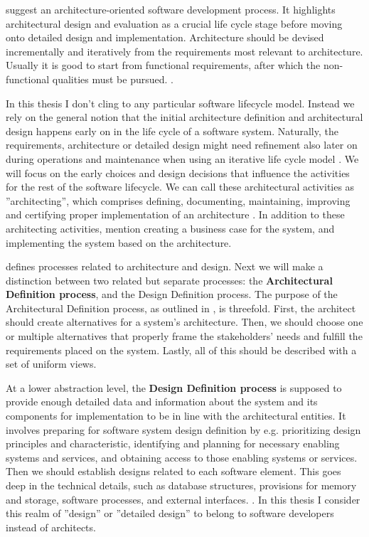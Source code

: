 \documentclass[utf8,english]{gradu3}
\begin{document}
\textcite{Koskimies2005} suggest an architecture-oriented software
development process. It highlights architectural design and evaluation as a
crucial life cycle stage before moving onto detailed design and implementation.
Architecture should be devised incrementally and iteratively from the
requirements most relevant to architecture. Usually it is good to start from
functional requirements, after which the non-functional qualities must be
pursued. \parencite{Koskimies2005}.

In this thesis I don't cling to any particular software lifecycle model.
Instead we rely on the general notion that the initial architecture definition
and architectural design happens early on in the life cycle of a software
system. Naturally, the requirements, architecture or detailed design might need
refinement also later on during operations and maintenance when using an
iterative life cycle model \parencite{IEEE12207}. We will focus on the early choices and
design decisions that influence the activities for the rest of the software
lifecycle. We can call these architectural activities as ''architecting'', which
comprises defining, documenting, maintaining, improving and certifying proper
implementation of an architecture \parencite[3]{IEEE42010}. In addition to these
architecting activities, \textcite[12]{Bass1998} mention creating a business case
for the system, and implementing the system based on the architecture.

\textcite{IEEE12207} defines processes related to architecture and design. Next we will
make a distinction between two related but separate processes: the \textbf{Architectural
  Definition process}, and the Design Definition process. The purpose of the
Architectural Definition process, as outlined in \textcite[66]{IEEE12207}, is threefold.
First, the architect should create alternatives for a system's architecture.
Then, we should choose one or multiple alternatives that properly frame the
stakeholders' needs and fulfill the requirements placed on the system. Lastly,
all of this should be described with a set of uniform views.

At a lower abstraction level, the \textbf{Design Definition process} \parencite[71]{IEEE12207} is
supposed to provide enough detailed data and information about the system and
its components for implementation to be in line with the architectural entities.
It involves preparing for software system design definition by e.g. prioritizing
design principles and characteristic, identifying and planning for necessary
enabling systems and services, and obtaining access to those enabling systems or
services. Then we should establish designs related to each software element.
This goes deep in the technical details, such as database structures, provisions
for memory and storage, software processes, and external interfaces. \parencite[72]{IEEE12207}.
In this thesis I consider this realm of ''design'' or ''detailed design'' to
belong to software developers instead of architects.
\end{document}
